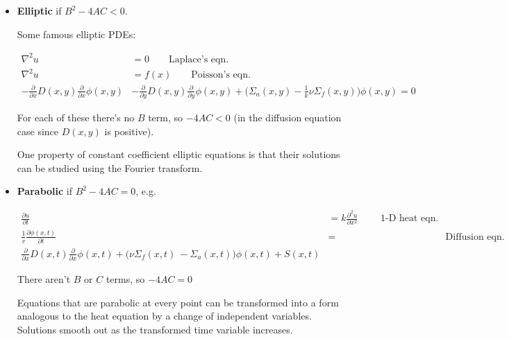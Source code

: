 \documentclass[12pt]{article}
\newcommand{\Macro}{\ensuremath{\Sigma}}
\begin{document}
\begin{itemize}
\item \textbf{Elliptic} if $B^2 - 4 AC < 0$.

Some famous elliptic PDEs:

\begin{align*}
\nabla^2 u &= 0 \qquad \text{Laplace's eqn.} \nonumber \\
\nabla^2 u &= f(x) \qquad \text{Poisson's eqn.} \nonumber \\
-\frac{\partial}{\partial x}D(x,y)\frac{\partial}{\partial x}\phi(x,y) &-
\frac{\partial}{\partial y}D(x,y)\frac{\partial}{\partial y}\phi(x,y) +
\bigl(\Macro_a(x,y) - \frac{1}{k} \nu \Macro_f(x,y)\bigr) \phi(x,y) =0\nonumber
\end{align*}

For each of these there's no $B$ term, so $-4AC < 0$ (in the diffusion 
equation case since $D(x,y)$ is positive).

One property of constant coefficient elliptic equations is that their 
solutions can be studied using the Fourier transform. %

\item \textbf{Parabolic} if $B^2 - 4 AC = 0$, e.g.

\begin{align}
\frac{\partial u}{\partial t} &=
k \frac{\partial^2 u}{\partial x^2} \qquad \text{ 1-D heat eqn.} \nonumber \\
\frac{1}{v}\frac{\partial \phi(x,t)}{\partial t} &=
& \qquad \qquad \text{Diffusion eqn.}\\
\frac{\partial}{\partial x}D(x,t)\frac{\partial}{\partial x}\phi(x,t) +
\bigl(\nu \Macro_f(x,t)\ - \Macro_a(x,t)\bigr) \phi(x,t) + S(x,t)\nonumber
\end{align}

There aren't $B$ or $C$ terms, so $-4AC = 0$

Equations that are parabolic at every point can be transformed into a form 
analogous to the heat equation by a change of independent variables. Solutions 
smooth out as the transformed time variable increases.


\end{itemize}
\end{document}
